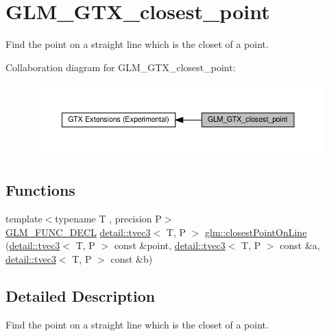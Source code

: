 \hypertarget{group__gtx__closest__point}{}\section{G\+L\+M\+\_\+\+G\+T\+X\+\_\+closest\+\_\+point}
\label{group__gtx__closest__point}


Find the point on a straight line which is the closet of a point.  


Collaboration diagram for G\+L\+M\+\_\+\+G\+T\+X\+\_\+closest\+\_\+point\+:\nopagebreak
\begin{figure}[H]
\begin{center}
\leavevmode
\includegraphics[width=350pt]{group__gtx__closest__point}
\end{center}
\end{figure}
\subsection*{Functions}
\begin{DoxyCompactItemize}
\item 
{\footnotesize template$<$typename T , precision P$>$ }\\\hyperlink{setup_8hpp_ab2d052de21a70539923e9bcbf6e83a51}{G\+L\+M\+\_\+\+F\+U\+N\+C\+\_\+\+D\+E\+CL} \hyperlink{structglm_1_1detail_1_1tvec3}{detail\+::tvec3}$<$ T, P $>$ \hyperlink{group__gtx__closest__point_ga03a6d7e93590f5d45050f6dc7aa8bf8f}{glm\+::closest\+Point\+On\+Line} (\hyperlink{structglm_1_1detail_1_1tvec3}{detail\+::tvec3}$<$ T, P $>$ const \&point, \hyperlink{structglm_1_1detail_1_1tvec3}{detail\+::tvec3}$<$ T, P $>$ const \&a, \hyperlink{structglm_1_1detail_1_1tvec3}{detail\+::tvec3}$<$ T, P $>$ const \&b)
\end{DoxyCompactItemize}


\subsection{Detailed Description}
Find the point on a straight line which is the closet of a point. 

